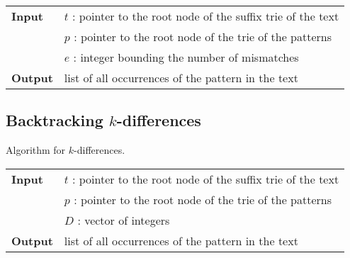 \begin{center}
\begin{minipage}[t]{.8\textwidth}
\begin{algorithm}[H]
\label{alg:st-hamming}
\begin{tabular}{ll}
\textbf{Input}  & $t$ : pointer to the root node of the suffix trie of the text\\
 			    & $p$ : pointer to the root node of the trie of the patterns\\
 			    & $e$ : integer bounding the number of mismatches\\
\textbf{Output} & list of all occurrences of the pattern in the text\\
\end{tabular}
\begin{algorithmic}[1]
		\State \Report {}
		\Repeat
			\State {}
			\State {}
			\State {}
		\Until {}
	\EndIf
\EndIf
\end{algorithmic}
\end{algorithm}
\end{minipage}
\end{center}

\subsection{Backtracking $k$-differences}

Algorithm for $k$-differences.

\begin{center}
\begin{minipage}[t]{.8\textwidth}
\begin{algorithm}[H]
\label{alg:st-edit}
\begin{tabular}{ll}
\textbf{Input}  & $t$ : pointer to the root node of the suffix trie of the text\\
 			    & $p$ : pointer to the root node of the trie of the patterns\\
 			    & $D$ : vector of integers\\
\textbf{Output} & list of all occurrences of the pattern in the text\\
\end{tabular}
\begin{algorithmic}[1]
	\State \Report {}
		\Repeat
			\State {}
	\EndIf
\EndIf
\end{algorithmic}
\end{algorithm}
\end{minipage}
\end{center}

